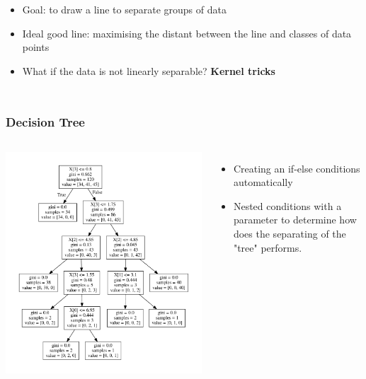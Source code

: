 \documentclass[aspectratio=169]{beamer}
\begin{document}
\begin{frame}
\begin{columns}
		\begin{itemize}
			\item<2-> Goal: to draw a line to separate groups of data
			\item<3-> Ideal good line: maximising the distant between the line and classes of data points
			\item<4-> What if the data is not linearly separable? \textbf{Kernel tricks}
		\end{itemize}
	\end{columns}
\end{frame}

\begin{frame}
	\frametitle{Decision Tree}
	\begin{columns}
		\includegraphics[width=1.0\textwidth]{imgs/decision_tree.pdf}
		\begin{itemize}
			\item<2-> Creating an if-else conditions automatically
			\item<3-> Nested conditions with a parameter to determine how does the separating of the "tree" performs.
		\end{itemize}
	\end{columns}
\end{frame}
\end{document}
